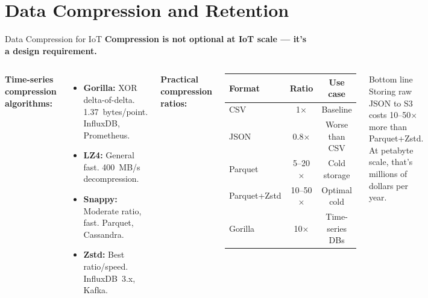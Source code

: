 \documentclass[aspectratio=169,11pt]{beamer}
\begin{document}
\section{Data Compression and Retention}

\begin{frame}{Data Compression for IoT}
    \small
    \textbf{Compression is not optional at IoT scale --- it's a design requirement.}

    \vspace{0.05cm}
    \begin{columns}
        \textbf{Time-series compression algorithms:}
        \begin{itemize}\setlength{\itemsep}{0pt}
            \item \textbf{Gorilla:} XOR delta-of-delta. 1.37~bytes/point. InfluxDB, Prometheus.
            \item \textbf{LZ4:} General fast. 400~MB/s decompression.
            \item \textbf{Snappy:} Moderate ratio, fast. Parquet, Cassandra.
            \item \textbf{Zstd:} Best ratio/speed. InfluxDB~3.x, Kafka.
        \end{itemize}

        \textbf{Practical compression ratios:}
        \begin{center}
        \footnotesize
        \begin{tabular}{lcc}
            \toprule
            \textbf{Format} & \textbf{Ratio} & \textbf{Use case} \\
            \midrule
            CSV & 1$\times$ & Baseline \\
            JSON & 0.8$\times$ & Worse than CSV \\
            Parquet & 5--20$\times$ & Cold storage \\
            Parquet+Zstd & 10--50$\times$ & Optimal cold \\
            Gorilla & 10$\times$ & Time-series DBs \\
            \bottomrule
        \end{tabular}
        \normalsize
        \end{center}

        \begin{exampleblock}{Bottom line}
            Storing raw JSON to S3 costs 10--50$\times$ more than Parquet+Zstd. At petabyte scale, that's millions of dollars per year.
        \end{exampleblock}
    \end{columns}
\end{frame}
\end{document}
